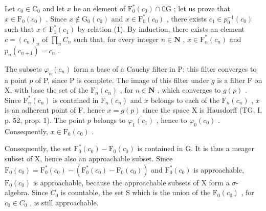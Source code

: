 Let \(c_0 \in \mathrm{C}_0\) and let \(x\) be an element of \(\mathrm{F}_0^*(c_0) \cap \complement \mathrm{G}\) ; let us prove that \(x \in \mathrm{F}_0(c_0)\) . Since \(x \notin \mathrm{G}_0(c_0)\) and \(x \in \mathrm{F}_0^*(c_0)\) , there exists \(c_1 \in p_0^{-1}(c_0)\) such that \(x \in \mathrm{F}_1^*(c_1)\) by relation (1). By induction, there exists an element \(c = (c_n)_n\) of \(\prod_n C_n\) such that, for every integer \(n \in \mathbf{N}\) , \(x \in \mathrm{F}_n^*(c_n)\) and \(p_n(c_{n+1}) = c_n\) .

The subsets \(\varphi_n(c_n)\) form a base of a Cauchy filter in P; this filter converges to a point \(p\) of P, since P is complete. The image of this filter under \(g\) is a filter F on X, with base the set of the \(\mathrm{F}_n(c_n)\) , for \(n\in \mathbf{N}\) , which converges to \(g(p)\) . Since \(\mathrm{F}_n^* (c_n)\) is contained in \(\overline{\mathrm{F}_n(c_n)}\) and \(x\) belongs to each of the \(\mathrm{F}_n(c_n)\) , \(x\) is an adherent point of F, hence \(x = g(p)\) since the space X is Hausdorff (TG, I, p. 52, prop. 1). The point \(p\) belongs to \(\overline{\varphi_1(c_1)}\) , hence to \(\varphi_0(c_0)\) . Consequently, \(x\in \mathrm{F}_0(c_0)\) .

Consequently, the set \(\mathrm{F}_{0}^{*}(c_{0}) - \mathrm{F}_{0}(c_{0})\) is contained in G. It is thus a meager subset of X, hence also an approachable subset. Since \(\mathrm{F}_{0}(c_{0}) = \mathrm{F}_{0}^{*}(c_{0}) - (\mathrm{F}_{0}^{*}(c_{0}) - \mathrm{F}_{0}(c_{0}))\) and \(\mathrm{F}_{0}^{*}(c_{0})\) is approachable, \(\mathrm{F}_{0}(c_{0})\) is approachable, because the approachable subsets of X form a \(\sigma\)-algebra. Since \(C_{0}\) is countable, the set S which is the union of the \(\mathrm{F}_{0}(c_{0})\) , for \(c_{0} \in C_{0}\) , is still approachable.


